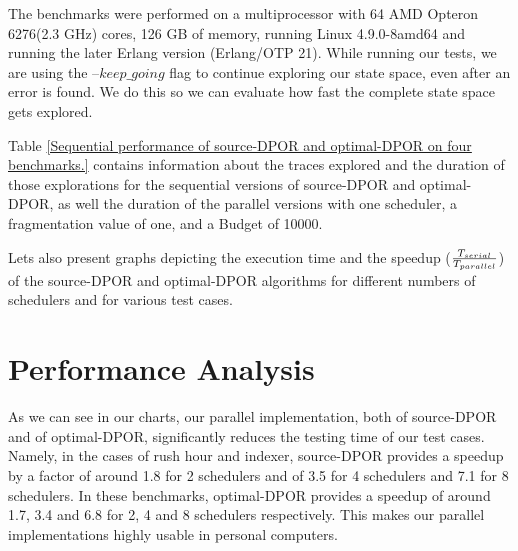 The benchmarks were performed on a multiprocessor with 64 AMD Opteron 6276(2.3 GHz) cores, 126 GB of memory, running
Linux 4.9.0-8amd64 and running the later Erlang version (Erlang/OTP 21). While running our tests, we are using the
--$keep\_going$ flag to continue exploring our state space, even after an error is found. We do this so we can evaluate
how fast the complete state space gets explored.

Table \ref{Sequential performance of source-DPOR and optimal-DPOR on four benchmarks.} contains information about the traces explored and the duration of those
explorations for the sequential versions of source-DPOR and optimal-DPOR, as well the duration of the parallel versions with one scheduler, a fragmentation value of one, and a Budget of 10000.


Lets also present graphs depicting the execution time and the speedup ($T_{serial} 
\over T_{parallel}$) of the source-DPOR and optimal-DPOR algorithms
for different numbers of schedulers and for various test cases.



\section{Performance Analysis}

As we can see in our charts, our parallel implementation, both of source-DPOR and of optimal-DPOR, significantly reduces the testing
time of our test cases. Namely, in the cases of rush hour and indexer, source-DPOR provides a speedup by a factor of around 1.8 for 2 schedulers and
of 3.5 for 4 schedulers and 7.1 for 8 schedulers. In these benchmarks, optimal-DPOR provides a speedup of around 1.7, 3.4 and 6.8 for 2, 4 and 8 schedulers respectively. This makes our parallel implementations highly usable in personal computers.

